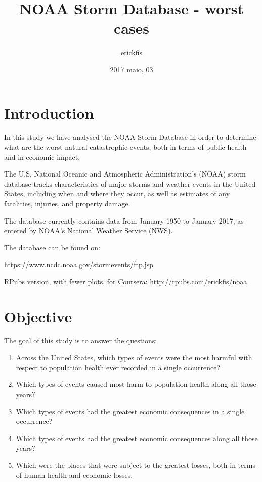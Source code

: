 \documentclass[]{article}
\title{NOAA Storm Database - worst cases}
\author{erickfis}
\date{2017 maio, 03}
\begin{document}
\maketitle

{
\setcounter{tocdepth}{3}
\tableofcontents
}
\section{Introduction}\label{introduction}

In this study we have analysed the NOAA Storm Database in order to
determine what are the worst natural catastrophic events, both in terms
of public health and in economic impact.

The U.S. National Oceanic and Atmospheric Administration's (NOAA) storm
database tracks characteristics of major storms and weather events in
the United States, including when and where they occur, as well as
estimates of any fatalities, injuries, and property damage.

The database currently contains data from January 1950 to January 2017,
as entered by NOAA's National Weather Service (NWS).

The database can be found on:

\url{https://www.ncdc.noaa.gov/stormevents/ftp.jsp}

RPubs version, with fewer plots, for Coursera:
\url{http://rpubs.com/erickfis/noaa}

\section{Objective}\label{objective}

The goal of this study is to answer the questions:

\begin{enumerate}
\def\labelenumi{\arabic{enumi}.}
\item
  Across the United States, which types of events were the most harmful
  with respect to population health ever recorded in a single
  occurrence?
\item
  Which types of events caused most harm to population health along all
  those years?
\item
  Which types of events had the greatest economic consequences in a
  single occurrence?
\item
  Which types of events had the greatest economic consequences along all
  those years?
\item
  Which were the places that were subject to the greatest losses, both
  in terms of human health and economic losses.
\end{enumerate}
\end{document}

